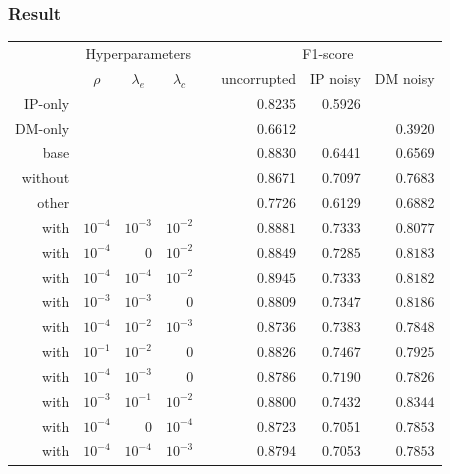 \documentclass[10pt]{beamer}
\begin{document}
\begin{frame}
\frametitle{Result}
\centering
\begin{tabular}{@{}rrrrcrrr@{}}\toprule
& \multicolumn{3}{c}{Hyperparameters} & \phantom{abc}& \multicolumn{3}{c}{F1-score}\\
\cmidrule{2-4} \cmidrule{6-8}
& \multicolumn{1}{c}{$\rho$} & \multicolumn{1}{c}{$\lambda_e$} & \multicolumn{1}{c}{$\lambda_c$} && \multicolumn{1}{r}{uncorrupted} & \multicolumn{1}{r}{IP noisy} & \multicolumn{1}{r}{DM noisy}\\ \midrule\midrule
IP-only & & & && 0.8235 & 0.5926 & \\
DM-only & & & && 0.6612 &  & 0.3920\\\midrule
base & & & && 0.8830 & 0.6441 & 0.6569\\
without & & & && 0.8671& 0.7097& 0.7683\\
other & & & && 0.7726 & 0.6129 & 0.6882\\\midrule
with & $10^{-4}$ & $10^{-3}$ & $10^{-2}$ && $\mathbf{0.8881}$& $\mathbf{0.7333}$& $\mathbf{0.8077}$\\
with & $10^{-4}$ & $0$ & $10^{-2}$ && $\mathbf{0.8849}$& $\mathbf{0.7285}$& $\mathbf{0.8183}$\\
with & $10^{-4}$ & $10^{-4}$ & $10^{-2}$ && $\mathbf{0.8945}$& $\mathbf{0.7333}$& $\mathbf{0.8182}$\\
with & $10^{-3}$ & $10^{-3}$ & $0$ && 0.8809& $\mathbf{0.7347}$& $\mathbf{0.8186}$\\
with & $10^{-4}$ & $10^{-2}$ & $10^{-3}$ && 0.8736& $\mathbf{0.7383}$& $\mathbf{0.7848}$\\
with & $10^{-1}$ & $10^{-2}$ & $0$ && 0.8826& $\mathbf{0.7467}$& $\mathbf{0.7925}$\\
with & $10^{-4}$ & $10^{-3}$ & $0$ && 0.8786& $\mathbf{0.7190}$& $\mathbf{0.7826}$\\
with & $10^{-3}$ & $10^{-1}$ & $10^{-2}$ && 0.8800& $\mathbf{0.7432}$& $\mathbf{0.8344}$\\
with & $10^{-4}$ & $0$ & $10^{-4}$ && 0.8723& 0.7051& $\mathbf{0.7853}$\\
with & $10^{-4}$ & $10^{-4}$ & $10^{-3}$ && 0.8794& 0.7053& $\mathbf{0.7853}$\\
\bottomrule
\end{tabular}
\end{frame}
\end{document}
